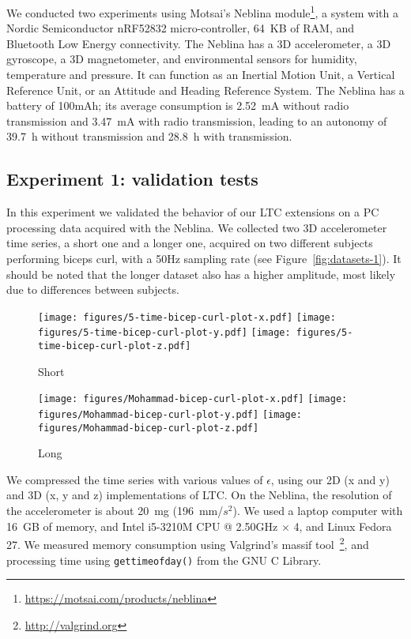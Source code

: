 \documentclass[10pt, conference, compsocconf]{IEEEtran}
\newcommand{\todo}[1]{\marginpar{\parbox{18mm}{\flushleft\tiny\color{red}\textbf{TODO}:
      #1}}}
\begin{document}
We conducted two experiments using Motsai's Neblina 
module\footnote{\url{ https://motsai.com/products/neblina}}, a system 
with a Nordic Semiconductor nRF52832 micro-controller, 64~KB of RAM, 
and Bluetooth Low Energy connectivity. The Neblina has a 3D 
accelerometer, a 3D gyroscope, a 3D magnetometer, and environmental sensors 
for humidity, temperature and pressure. It can function as an Inertial 
Motion Unit, a Vertical Reference Unit, or an Attitude and Heading 
Reference System. The Neblina has a battery of 100mAh; its average 
consumption is 2.52~mA without radio transmission and 3.47~mA with 
radio transmission, leading to an autonomy of 39.7~h without 
transmission and 28.8~h with transmission. \todo{Omid, could you review
this paragraph?}

\subsection{Experiment 1: validation tests}

In this experiment we validated the behavior of our LTC extensions on a 
PC processing data acquired with the Neblina. We collected two 3D 
accelerometer time series, a short one and a longer one, acquired 
on two different subjects performing biceps curl, with a 50Hz sampling rate (see 
Figure~\ref{fig:datasets-1}). It should be noted that the longer dataset also has 
a higher amplitude, most likely due to differences between subjects.

\begin{figure*}
\begin{subfigure}{2\columnwidth}
\texttt{[image: figures/5-time-bicep-curl-plot-x.pdf]}
\texttt{[image: figures/5-time-bicep-curl-plot-y.pdf]}
\texttt{[image: figures/5-time-bicep-curl-plot-z.pdf]}
\caption{Short}
\end{subfigure}
\begin{subfigure}{2\columnwidth}
\texttt{[image: figures/Mohammad-bicep-curl-plot-x.pdf]}
\texttt{[image: figures/Mohammad-bicep-curl-plot-y.pdf]}
\texttt{[image: figures/Mohammad-bicep-curl-plot-z.pdf]}
\caption{Long} 
\end{subfigure}
\caption{Time series used in Experiment 1}
\label{fig:datasets-1}
\end{figure*}

We compressed the time series with various values of $\epsilon$, using our 
2D (x and y) and 3D (x, y and z) implementations of LTC. On the Neblina,
the resolution of the accelerometer is about 20~mg (196~mm/$s^2$).
 We used a 
laptop computer with 16~GB of memory, and Intel i5-3210M CPU @ 2.50GHz 
× 4, and Linux Fedora 27. We measured memory consumption using 
Valgrind's massif 
tool~\cite{nethercote2006building}\footnote{\url{http://valgrind.org}}, 
and processing time using \texttt{gettimeofday()} from the GNU C 
Library. 
\end{document}
